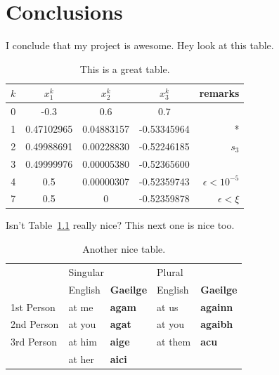\documentclass[12pt]{report}
\begin{document}



\chapter{Conclusions}

I conclude that my project is awesome.  Hey look at this table.
\begin{table}[htb]
\begin{center}
\begin{tabular}{|c|ccc|r|}
	\hline
$k$ &  $x_1^k$    &   $x_2^k$  & $x_3^k$   & remarks  \\
	\hline
0   & -0.3 & 0.6 & 0.7  &  \\
1   & 0.47102965 & 0.04883157 & -0.53345964  & *\\
2   & 0.49988691 & 0.00228830 & -0.52246185 & $s_3$ \\
3   & 0.49999976 & 0.00005380 & -0.52365600  & \\
4   & 0.5 & 0.00000307 & -0.52359743  & $\epsilon < 10^{-5}$ \\
7   & 0.5 & 0 & -0.52359878  & $\epsilon < \xi $ \\
	\hline
\end{tabular}
\caption{This is a great table.}
\label{greatTable}
\end{center}
\end{table}

Isn't Table~\ref{greatTable} really nice?  This next one is nice too.

\begin{table}[htb]
\begin{center}
\begin{tabular}{|l||l|l||l|l|}
\hline
 &\multicolumn{2}{l|}{Singular}&\multicolumn{2}{l|}{Plural}\\
\cline{2-5}
 &English&\textbf{Gaeilge}&English&\textbf{Gaeilge}\\
\hline\hline
1st Person&at me&\textbf{agam}&at us&\textbf{againn}\\
2nd Person&at you&\textbf{agat}&at you&\textbf{agaibh}\\
3rd Person&at him&\textbf{aige}&at them&\textbf{acu}\\
 &at her&\textbf{aici}& & \\
\hline
\end{tabular}
\caption{Another nice table.}
\end{center}
\end{table}
\end{document}

